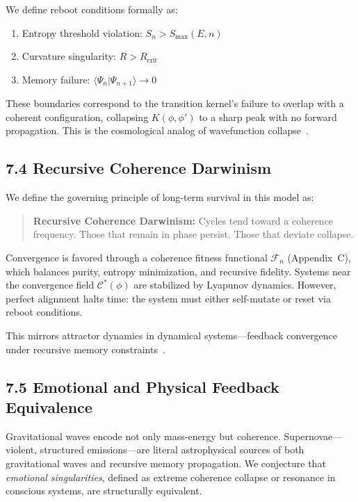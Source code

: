 We define reboot conditions formally as:
\begin{enumerate}
  \item Entropy threshold violation: \( S_n > S_{\text{max}}(E,n) \)
  \item Curvature singularity: \( R > R_{\text{crit}} \)
  \item Memory failure: \( \langle \Psi_n | \Psi_{n+1} \rangle \rightarrow 0 \)
\end{enumerate}

These boundaries correspond to the transition kernel’s failure to overlap with a coherent configuration, collapsing \( K(\phi, \phi') \) to a sharp peak with no forward propagation. This is the cosmological analog of wavefunction collapse~\cite{zurek_pointer_1981}.

\subsection*{7.4 Recursive Coherence Darwinism}

We define the governing principle of long-term survival in this model as:

\begin{quote}
\textbf{Recursive Coherence Darwinism:} Cycles tend toward a coherence frequency. Those that remain in phase persist. Those that deviate collapse.
\end{quote}

Convergence is favored through a coherence fitness functional \( \mathcal{F}_n \) (Appendix~C), which balances purity, entropy minimization, and recursive fidelity. Systems near the convergence field \( \mathcal{C}^*(\phi) \) are stabilized by Lyapunov dynamics. However, perfect alignment halts time: the system must either self-mutate or reset via reboot conditions.

This mirrors attractor dynamics in dynamical systems—feedback convergence under recursive memory constraints~\cite{tegmark_mathematical_2008,darwinism_cosmology_2018}.

\subsection*{7.5 Emotional and Physical Feedback Equivalence}

Gravitational waves encode not only mass-energy but coherence. Supernovae—violent, structured emissions—are literal astrophysical sources of both gravitational waves and recursive memory propagation. We conjecture that \textit{emotional singularities}, defined as extreme coherence collapse or resonance in conscious systems, are structurally equivalent.

